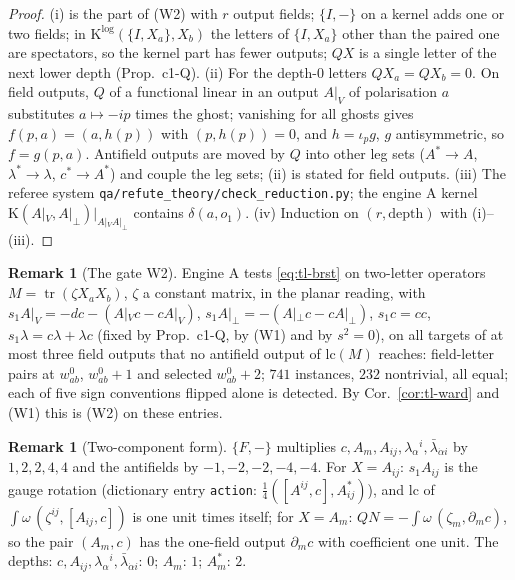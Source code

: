 \documentclass[11pt]{article}
\numberwithin{equation}{section}
\theoremstyle{plain}
\theoremstyle{definition}
\newtheorem{remark}[theorem]{Remark}
\begin{document}
\begin{proof}
(i) is the part of (W2) with $r$ output fields; $\{I,-\}$ on a kernel adds one or two fields; in $\mathrm K^{\log}(\{I,X_a\},X_b)$ the letters of $\{I,X_a\}$ other than the paired one are spectators, so the kernel part has fewer outputs; $QX$ is a single letter of the next lower depth (Prop.~c1-Q). (ii) For the depth-$0$ letters $QX_a=QX_b=0$. On field outputs, $Q$ of a functional linear in an output $A|_V$ of polarisation $a$ substitutes $a\mapsto-ip$ times the ghost; vanishing for all ghosts gives $f(p,a)=(a,h(p))$ with $(p,h(p))=0$, and $h=\iota_pg$, $g$ antisymmetric, so $f=g(p,a)$. Antifield outputs are moved by $Q$ into other leg sets ($A^*\to A$, $\lambda^*\to\lambda$, $c^*\to A^*$) and couple the leg sets; (ii) is stated for field outputs. (iii) The referee system \texttt{qa/refute\_theory/check\_reduction.py}; the engine A kernel $\mathrm K(A|_V,A|_\perp)|_{A|_VA|_\perp}$ contains $\delta(a,o_1)$. (iv) Induction on $(r,\text{depth})$ with (i)--(iii).
\end{proof}

\begin{remark}[The gate W2]
\label{rem:tl-W2gate}
Engine A tests \eqref{eq:tl-brst} on two-letter operators $M=\operatorname{tr}(\zeta X_aX_b)$, $\zeta$ a constant matrix, in the planar reading, with $s_1A|_V=-dc-(A|_Vc-cA|_V)$, $s_1A|_\perp=-(A|_\perp c-cA|_\perp)$, $s_1c=cc$, $s_1\lambda=c\lambda+\lambda c$ (fixed by Prop.~c1-Q, by (W1) and by $s^2=0$), on all targets of at most three field outputs that no antifield output of $\mathrm{lc}(M)$ reaches: field-letter pairs at $w^0_{ab}$, $w^0_{ab}+1$ and selected $w^0_{ab}+2$; $741$ instances, $232$ nontrivial, all equal; each of five sign conventions flipped alone is detected. By Cor.~\ref{cor:tl-ward} and (W1) this is (W2) on these entries.
\end{remark}

\begin{remark}[Two-component form]
$\{F,-\}$ multiplies $c,A_m,A_{ij},\lambda_\alpha{}^i,\bar\lambda_{\dot\alpha i}$ by $1,2,2,4,4$ and the antifields by $-1,-2,-2,-4,-4$. For $X=A_{ij}$: $s_1A_{ij}$ is the gauge rotation (dictionary entry \texttt{action}: $\tfrac14([A^{ij},c],A^*_{ij})$), and $\mathrm{lc}$ of $\int\omega\,(\zeta^{ij},[A_{ij},c])$ is one unit times itself; for $X=A_m$: $QN=-\int\omega\,(\zeta_m,\partial_mc)$, so the pair $(A_m,c)$ has the one-field output $\partial_mc$ with coefficient one unit. The depths: $c,A_{ij},\lambda_\alpha{}^i,\bar\lambda_{\dot\alpha i}$: $0$; $A_m$: $1$; $A^*_m$: $2$.
\end{remark}
\end{document}
